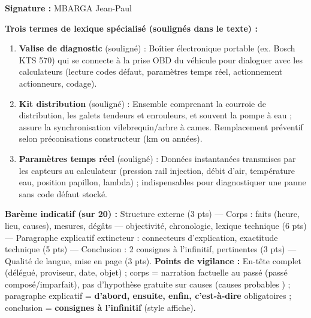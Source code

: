 \documentclass[11pt]{article}
\begin{document}
\begin{exemplebox}
\textbf{Signature :} MBARGA Jean-Paul

\textbf{Trois termes de lexique spécialisé (soulignés dans le texte) :}
\begin{enumerate}
\item \textbf{Valise de diagnostic} (souligné) : Boîtier électronique portable (ex. Bosch KTS 570) qui se connecte à la prise OBD du véhicule pour dialoguer avec les calculateurs (lecture codes défaut, paramètres temps réel, actionnement actionneurs, codage).
\item \textbf{Kit distribution} (souligné) : Ensemble comprenant la courroie de distribution, les galets tendeurs et enrouleurs, et souvent la pompe à eau ; assure la synchronisation vilebrequin/arbre à cames. Remplacement préventif selon préconisations constructeur (km ou années).
\item \textbf{Paramètres temps réel} (souligné) : Données instantanées transmises par les capteurs au calculateur (pression rail injection, débit d'air, température eau, position papillon, lambda) ; indispensables pour diagnostiquer une panne sans code défaut stocké.
\end{enumerate}
\end{exemplebox}

\begin{corrige}
\textbf{Barème indicatif (sur 20) :} Structure externe (3 pts) — Corps : faits (heure, lieu, causes), mesures, dégâts — objectivité, chronologie, lexique technique (6 pts) — Paragraphe explicatif extincteur : connecteurs d'explication, exactitude technique (5 pts) — Conclusion : 2 consignes à l'infinitif, pertinentes (3 pts) — Qualité de langue, mise en page (3 pts). \textbf{Points de vigilance :} En-tête complet (délégué, proviseur, date, objet) ; corps = narration factuelle au passé (passé composé/imparfait), pas d'hypothèse gratuite sur causes (\og causes probables \fg) ; paragraphe explicatif = \textbf{d'abord, ensuite, enfin, c'est-à-dire} obligatoires ; conclusion = \textbf{consignes à l'infinitif} (style affiche).
\end{corrige}
\end{document}
